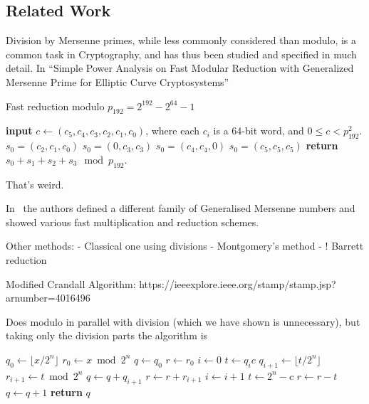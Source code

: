 
\subsection{Related Work}

Division by Mersenne primes, while less commonly considered than modulo, is a common task in Cryptography, and has thus been studied and specified in much detail.
In ``Simple Power Analysis on Fast Modular Reduction with Generalized Mersenne Prime for Elliptic Curve Cryptosystems''

\cite{sakai2006simple}

\begin{algorithm}
   \caption{Fast reduction modulo $p_{192} = 2^{192} - 2^{64} - 1$}
   \begin{algorithmic}
      \State \textbf{input} $c \gets (c_5, c_4, c_3, c_2, c_1, c_0)$, where each $c_i$ is a 64-bit word, and $0 \le c < p^2_{192}$.
      \State $s_0 = (c_2, c_1, c_0)$
      \State $s_0 = (0, c_3, c_3)$
      \State $s_0 = (c_4, c_4, 0)$
      \State $s_0 = (c_5, c_5, c_5)$
      \State \textbf{return} $s_0 + s_1 + s_2 + s_3 \mod p_{192}$.
   \end{algorithmic}
\end{algorithm}
That's weird.

In~\cite{granger2013generalised} the authors defined a different family of Generalised Mersenne numbers and showed various fast multiplication and reduction schemes.

Other methods:
 - Classical one using divisions
 - Montgomery's method
 - ! Barrett reduction

Modified Crandall Algorithm:
https://ieeexplore.ieee.org/stamp/stamp.jsp?arnumber=4016496

Does modulo in parallel with division (which we have shown is unnecessary), but taking only the division parts the algorithm is
\begin{algorithm}
   \begin{algorithmic}[1]
         \State $q_0 \gets \lfloor x/2^n\rfloor$
         \State $r_0 \gets x \bmod 2^n$
         \State $q \gets q_0$
         \State $r \gets r_0$
         \State $i \gets 0$
            \State $t \gets q_i c$
            \State $q_{i+1} \gets \lfloor t / 2^n\rfloor$
            \State $r_{i+1} \gets t \bmod 2^n$
            \State $q\gets q+q_{i+1}$
            \State $r\gets r+r_{i+1}$
            \State $i\gets i+1$
         \EndWhile
         \State $t \gets 2^n-c$
            \State $r\gets r-t$
            \State $q\gets q+1$
         \EndWhile
         \State\textbf{return} $q$
      \EndProcedure
   \end{algorithmic}
\end{algorithm}

